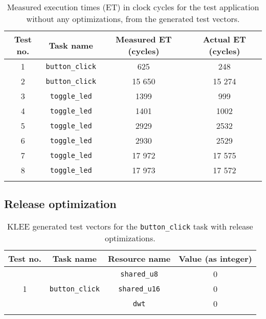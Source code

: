 \begin{longtable}{|c | c | c | c|}
    \hline
    Test no. & Task name & Measured ET (cycles) & Actual ET (cycles) \\ [0.5ex]
    \hline
    1 & \texttt{button\_click} & 625 & 248 \\
    \hline
    2 & \texttt{button\_click} & 15 650 & 15 274 \\
    \hline
    3 & \texttt{toggle\_led} & 1399 & 999  \\
    \hline
    4 & \texttt{toggle\_led} & 1401  & 1002 \\
    \hline
    5 & \texttt{toggle\_led} & 2929  & 2532 \\
    \hline
    6 & \texttt{toggle\_led} & 2930 & 2529 \\
    \hline
    7 & \texttt{toggle\_led} & 17 972 & 17 575 \\
    \hline
    8 & \texttt{toggle\_led} & 17 973 & 17 572 \\
    \hline
\caption{Measured execution times (ET) in clock cycles for the test application without any optimizations, from the generated test vectors.}
\label{tab:evaldebugmeasure}
\end{longtable}

\subsection{Release optimization}

\begin{longtable}{|c|c|c|c|}
\hline
Test no. & Task name & Resource name & Value (as integer) \\ \hline
\multirow{3}{*}{1} & \multirow{3}{*}{\texttt{button\_click}} & \texttt{shared\_u8}  & 0 \\ \cline{3-4} 
                   &                                         & \texttt{shared\_u16} & 0 \\ \cline{3-4} 
                   &                                         & \texttt{dwt}         & 0 \\ \hline
\caption{KLEE generated test vectors for the \texttt{button\_click} task with release optimizations.}
\label{tab:evalreleasetestsbutton}
\end{longtable}


